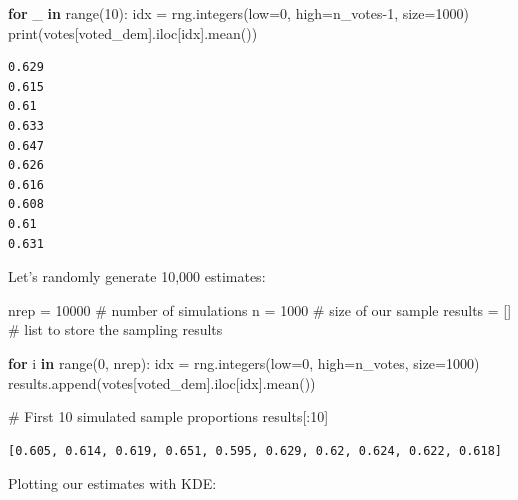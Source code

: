 \documentclass[
  letterpaper,
  DIV=11,
  numbers=noendperiod]{scrreprt}
\newenvironment{Shaded}{\begin{snugshade}}{\end{snugshade}}
\newcommand{\BuiltInTok}[1]{\textcolor[rgb]{0.00,0.23,0.31}{#1}}
\newcommand{\CommentTok}[1]{\textcolor[rgb]{0.37,0.37,0.37}{#1}}
\newcommand{\ControlFlowTok}[1]{\textcolor[rgb]{0.00,0.23,0.31}{\textbf{#1}}}
\newcommand{\DecValTok}[1]{\textcolor[rgb]{0.68,0.00,0.00}{#1}}
\newcommand{\KeywordTok}[1]{\textcolor[rgb]{0.00,0.23,0.31}{\textbf{#1}}}
\newcommand{\NormalTok}[1]{\textcolor[rgb]{0.00,0.23,0.31}{#1}}
\newcommand{\OperatorTok}[1]{\textcolor[rgb]{0.37,0.37,0.37}{#1}}
\newcommand{\StringTok}[1]{\textcolor[rgb]{0.13,0.47,0.30}{#1}}
\begin{document}
\begin{Shaded}
\begin{Highlighting}[]
\ControlFlowTok{for}\NormalTok{ \_ }\KeywordTok{in} \BuiltInTok{range}\NormalTok{(}\DecValTok{10}\NormalTok{):}
\NormalTok{  idx }\OperatorTok{=}\NormalTok{ rng.integers(low}\OperatorTok{=}\DecValTok{0}\NormalTok{, high}\OperatorTok{=}\NormalTok{n\_votes}\OperatorTok{{-}}\DecValTok{1}\NormalTok{, size}\OperatorTok{=}\DecValTok{1000}\NormalTok{)}
  \BuiltInTok{print}\NormalTok{(votes[}\StringTok{\textquotesingle{}voted\_dem\textquotesingle{}}\NormalTok{].iloc[idx].mean())}
\end{Highlighting}
\end{Shaded}

\begin{verbatim}
0.629
0.615
0.61
0.633
0.647
0.626
0.616
0.608
0.61
0.631
\end{verbatim}

Let's randomly generate 10,000 estimates:

\begin{Shaded}
\begin{Highlighting}[]
\NormalTok{nrep }\OperatorTok{=} \DecValTok{10000}   \CommentTok{\# number of simulations}
\NormalTok{n }\OperatorTok{=} \DecValTok{1000}       \CommentTok{\# size of our sample}
\NormalTok{results }\OperatorTok{=}\NormalTok{ []   }\CommentTok{\# list to store the sampling results}

\ControlFlowTok{for}\NormalTok{ i }\KeywordTok{in} \BuiltInTok{range}\NormalTok{(}\DecValTok{0}\NormalTok{, nrep):}
\NormalTok{    idx }\OperatorTok{=}\NormalTok{ rng.integers(low}\OperatorTok{=}\DecValTok{0}\NormalTok{, high}\OperatorTok{=}\NormalTok{n\_votes, size}\OperatorTok{=}\DecValTok{1000}\NormalTok{)}
\NormalTok{    results.append(votes[}\StringTok{\textquotesingle{}voted\_dem\textquotesingle{}}\NormalTok{].iloc[idx].mean())}

\CommentTok{\# First 10 simulated sample proportions}
\NormalTok{results[:}\DecValTok{10}\NormalTok{]}
\end{Highlighting}
\end{Shaded}

\begin{verbatim}
[0.605, 0.614, 0.619, 0.651, 0.595, 0.629, 0.62, 0.624, 0.622, 0.618]
\end{verbatim}

Plotting our estimates with KDE:
\end{document}
